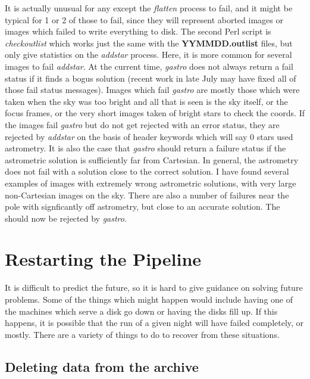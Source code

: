 \documentclass{article}
\newcommand\pr{\em}                   %
\newcommand\ff{\bf}                   %
\begin{document}
It is actually unusual for any except the {\pr flatten} process to
fail, and it might be typical for 1 or 2 of those to fail, since they
will represent aborted images or images which failed to write
everything to disk.  The second Perl script is {\pr checkoutlist}
which works just the same with the {\ff YYMMDD.outlist} files, but
only give statistics on the {\pr addstar} process.  Here, it is more
common for several images to fail {\pr addstar}.  At the current time,
{\pr gastro} does not always return a fail status if it finds a bogus
solution (recent work in late July may have fixed all of those fail
status messages).  Images which fail {\pr gastro} are mostly those
which were taken when the sky was too bright and all that is seen is
the sky itself, or the focus frames, or the very short images taken of
bright stars to check the coords.  If the images fail {\pr gastro} but
do not get rejected with an error status, they are rejected by {\pr
addstar} on the basis of header keywords which will say 0 stars used
astrometry.  It is also the case that {\pr gastro} should return a
failure status if the astrometric solution is sufficiently far from
Cartesian.  In general, the astrometry does not fail with a solution
close to the correct solution.  I have found several examples of
images with extremely wrong astrometric solutions, with very large
non-Cartesian images on the sky.  There are also a number of failures
near the pole with signficantly off astrometry, but close to an
accurate solution.  The should now be rejected by {\pr gastro}.

\section{Restarting the Pipeline}

It is difficult to predict the future, so it is hard to give guidance
on solving future problems.  Some of the things which might happen
would include having one of the machines which serve a disk go down or
having the disks fill up.  If this happens, it is possible that the
run of a given night will have failed completely, or mostly.  There
are a variety of things to do to recover from these situations.

\subsection{Deleting data from the archive}
\end{document}
